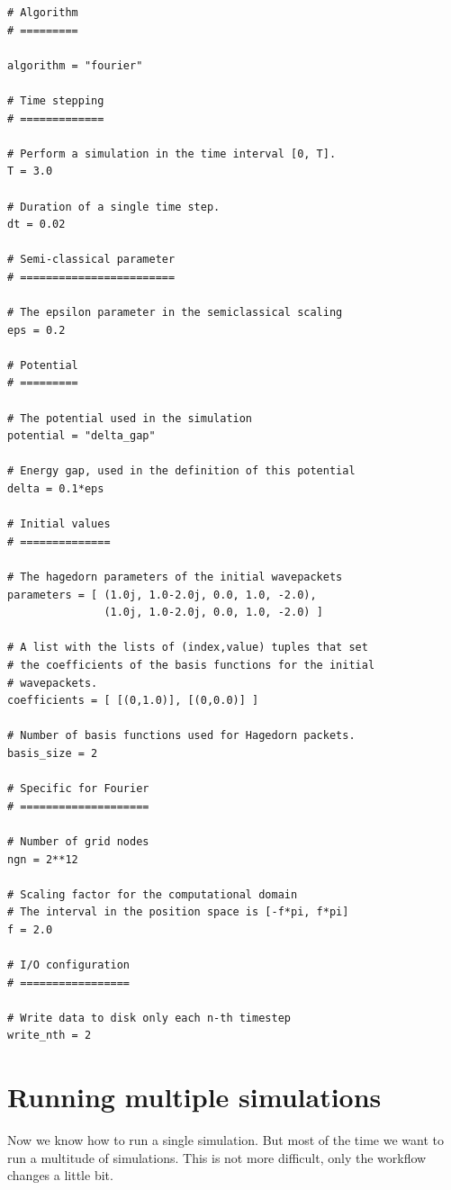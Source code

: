\documentclass[a4paper,10pt]{report}
\begin{document}
% 
\begin{lstlisting}[float=tp,frame=single,label=lstparameters01,caption={Sample configuration \texttt{parameters\_01.py}}]
# Algorithm
# =========

algorithm = "fourier"

# Time stepping
# =============

# Perform a simulation in the time interval [0, T].
T = 3.0

# Duration of a single time step.
dt = 0.02

# Semi-classical parameter
# ========================

# The epsilon parameter in the semiclassical scaling
eps = 0.2

# Potential
# =========

# The potential used in the simulation
potential = "delta_gap"

# Energy gap, used in the definition of this potential
delta = 0.1*eps

# Initial values
# ==============

# The hagedorn parameters of the initial wavepackets
parameters = [ (1.0j, 1.0-2.0j, 0.0, 1.0, -2.0),
               (1.0j, 1.0-2.0j, 0.0, 1.0, -2.0) ]

# A list with the lists of (index,value) tuples that set
# the coefficients of the basis functions for the initial
# wavepackets.
coefficients = [ [(0,1.0)], [(0,0.0)] ]

# Number of basis functions used for Hagedorn packets.
basis_size = 2

# Specific for Fourier
# ====================

# Number of grid nodes
ngn = 2**12

# Scaling factor for the computational domain
# The interval in the position space is [-f*pi, f*pi]
f = 2.0

# I/O configuration
# =================

# Write data to disk only each n-th timestep
write_nth = 2
\end{lstlisting}


\section{Running multiple simulations}

Now we know how to run a single simulation. But most of the time we want to run
a multitude of simulations. This is not more difficult, only the workflow changes
a little bit.
\end{document}
